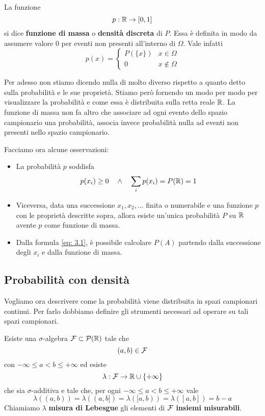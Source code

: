 \begin{definition}
	La funzione
	\[ p : \mathbb{R} \to [0,1] \]
	si dice \textbf{funzione di massa} o \textbf{densità discreta} di $P$. Essa è definita in modo
	da assumere valore 0 per eventi non presenti all'interno di $\Omega$. Vale infatti
	\[
		p(x) = \begin{cases}
			P(\{ x \}) & x \in \Omega    \\[1ex]
			0          & x \notin \Omega
		\end{cases}
	\]
\end{definition}

Per adesso non stiamo dicendo nulla di molto diverso rispetto a quanto detto sulla probabilità e
le sue proprietà. Stiamo però fornendo un modo per modo per visualizzare la probabilità e come
essa è distribuita sulla retta reale $\mathbb{R}$. La funzione di massa non fa altro che associare ad
ogni evento dello spazio campionario una probabilità, associa invece probabilità nulla ad eventi
non presenti nello spazio campionario.

\begin{observation}
	Facciamo ora alcune osservazioni:
	\begin{itemize}
		\item La probabilità $p$ soddisfa
		      \[ p(x_i) \geq 0 \quad \land \quad \sum_i p(x_i) = P(\mathbb{R}) = 1 \]
		\item Viceversa, data una successione $x_1, x_2, \dots$ finita o numerabile e una funzione
		      $p$ con le proprietà descritte sopra, allora esiste un'unica probabilità $P$ su $\mathbb{R}$
		      avente $p$ come funzione di massa.
		\item Dalla formula \ref{eq: 3.1}, è possibile calcolare $P(A)$ partendo dalla successione
		      degli $x_i$ e dalla funzione di massa.
	\end{itemize}
\end{observation}

\subsection{Probabilità con densità}
Vogliamo ora descrivere come la probabilità viene distribuita in spazi campionari continui. Per
farlo dobbiamo definire gli strumenti necessari ad operare su tali spazi campionari.

\begin{theorem}
	Esiste una $\sigma$-algebra $\mathcal{F} \subset \mathcal{P}(\mathbb{R})$ tale che
	\[ (a, b) \in \mathcal{F} \]
	con $-\infty \leq a < b \leq +\infty$ ed esiste
	\[ \lambda : \mathcal{F} \to \mathbb{R} \cup \{ +\infty \} \]
	che sia $\sigma$-additiva e tale che, per ogni $-\infty \leq a < b \leq +\infty$ vale
	\[ \lambda((a,b)) = \lambda((a,b]) = \lambda ([a,b)) = \lambda([a,b]) = b - a \]
	Chiamiamo $\lambda$ \textbf{misura di Lebesgue} gli elementi di $\mathcal{F}$
	\textbf{insiemi misurabili}.
\end{theorem}

